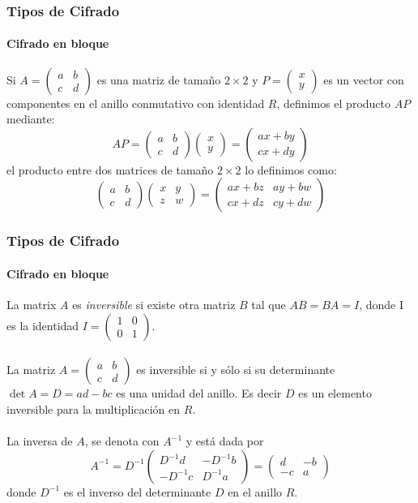 \documentclass[spanish, mexico]{beamer}
\begin{document}
	\begin{frame}
		\frametitle{Tipos de Cifrado}
		\framesubtitle{Cifrado en bloque}
		 Si $A = \begin{pmatrix} a & b \\c & d \end{pmatrix}$ es una matriz de tamaño $2 \times 2$ y $P = \begin{pmatrix} x \\ y \end{pmatrix}$ es un vector con componentes en el anillo conmutativo con identidad $R$, definimos el producto $AP$ mediante:
		$$AP = \begin{pmatrix} a & b \\c & d \end{pmatrix} \begin{pmatrix} x \\ y \end{pmatrix} =  \begin{pmatrix} ax + by\\ cx + dy \end{pmatrix}$$
		el producto entre dos matrices de tamaño $2 \times 2$ lo definimos como:
		$$\begin{pmatrix}a & b\\ c & d\end{pmatrix} \begin{pmatrix}x & y\\ z & w\end{pmatrix} = \begin{pmatrix}ax + bz & ay + bw\\ cx + dz & cy + dw\end{pmatrix}$$
	\end{frame}
	
	\begin{frame}
		\frametitle{Tipos de Cifrado}
		\framesubtitle{Cifrado en bloque}
		 La matrix $A$ es \textit{inversible} si existe otra matriz $B$ tal que $AB = BA = I$, donde I es la identidad $I = \begin{pmatrix}1 & 0\\0 & 1\end{pmatrix}$.\\~\\
		 La matriz $A = \begin{pmatrix} a & b\\ c & d\end{pmatrix}$ es inversible si y sólo si su determinante $\det A = D = ad - bc$ es una unidad del anillo. Es decir $D$ es un elemento inversible para la multiplicación en $R$.\\~\\
		 La inversa de $A$, se denota con $A^{-1}$ y está dada por
 		 $$A^{-1} = D^{-1} \begin{pmatrix}D^{-1}d & -D^{-1}b\\-D^{-1}c & D^{-1}a\end{pmatrix} = \begin{pmatrix}d & -b\\-c & a\end{pmatrix}$$
		 donde $D^{-1}$ es el inverso del determinante $D$ en el anillo $R$.
	\end{frame}
	
\end{document}
